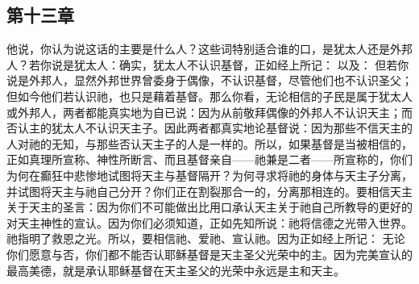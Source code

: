 
\subsection{第十三章}

\par

他说，你认为说这话的主要是什么人？这些词特别适合谁的口，是犹太人还是外邦人？若你说是犹太人：确实，犹太人不认识基督，正如经上所记： 以及： 但若你说是外邦人，显然外邦世界曾委身于偶像，不认识基督，尽管他们也不认识圣父；但如今他们若认识祂，也只是藉着基督。那么你看，无论相信的子民是属于犹太人或外邦人，两者都能真实地为自已说：因为从前敬拜偶像的外邦人不认识天主；而否认主的犹太人不认识天主子。因此两者都真实地论基督说：因为那些不信天主的人对祂的无知，与那些否认天主子的人是一样的。所以，如果基督是当被相信的，正如真理所宣称、神性所断言、而且基督亲自——祂兼是二者——所宣称的，你们为何在癫狂中悲惨地试图将天主与基督隔开？为何寻求将祂的身体与天主子分离，并试图将天主与祂自己分开？你们正在割裂那合一的，分离那相连的。要相信天主关于天主的圣言：因为你们不可能做出比用口承认天主关于祂自己所教导的更好的对天主神性的宣认。因为你们必须知道，正如先知所说：祂将信德之光带入世界。祂指明了救恩之光。所以，要相信祂、爱祂、宣认祂。因为正如经上所记： 无论你们愿意与否，你们都不能否认耶稣基督是天主圣父光荣中的主。因为完美宣认的最高美德，就是承认耶稣基督在天主圣父的光荣中永远是主和天主。\par



